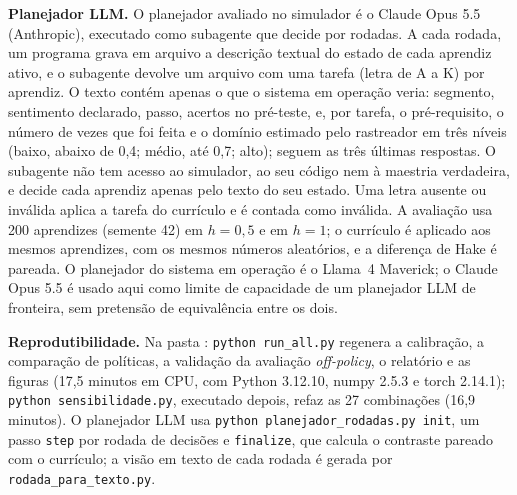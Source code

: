 \noindent\textbf{Planejador LLM.} O planejador avaliado no simulador é o Claude Opus 5.5 (Anthropic), executado como subagente que decide por rodadas. A cada rodada, um programa grava em arquivo a descrição textual do estado de cada aprendiz ativo, e o subagente devolve um arquivo com uma tarefa (letra de A a K) por aprendiz. O texto contém apenas o que o sistema em operação veria: segmento, sentimento declarado, passo, acertos no pré-teste, e, por tarefa, o pré-requisito, o número de vezes que foi feita e o domínio estimado pelo rastreador em três níveis (baixo, abaixo de 0,4; médio, até 0,7; alto); seguem as três últimas respostas. O subagente não tem acesso ao simulador, ao seu código nem à maestria verdadeira, e decide cada aprendiz apenas pelo texto do seu estado. Uma letra ausente ou inválida aplica a tarefa do currículo e é contada como inválida. A avaliação usa 200 aprendizes (semente 42) em $h = 0{,}5$ e em $h = 1$; o currículo é aplicado aos mesmos aprendizes, com os mesmos números aleatórios, e a diferença de Hake é pareada. O planejador do sistema em operação é o Llama~4 Maverick; o Claude Opus 5.5 é usado aqui como limite de capacidade de um planejador LLM de fronteira, sem pretensão de equivalência entre os dois.

\noindent\textbf{Reprodutibilidade.} Na pasta : \texttt{python run\_all.py} regenera a calibração, a comparação de políticas, a validação da avaliação \textit{off-policy}, o relatório e as figuras (17,5 minutos em CPU, com Python 3.12.10, numpy 2.5.3 e torch 2.14.1); \texttt{python sensibilidade.py}, executado depois, refaz as 27 combinações (16,9 minutos). O planejador LLM usa \texttt{python planejador\_rodadas.py init}, um passo \texttt{step} por rodada de decisões e \texttt{finalize}, que calcula o contraste pareado com o currículo; a visão em texto de cada rodada é gerada por \texttt{rodada\_para\_texto.py}.

